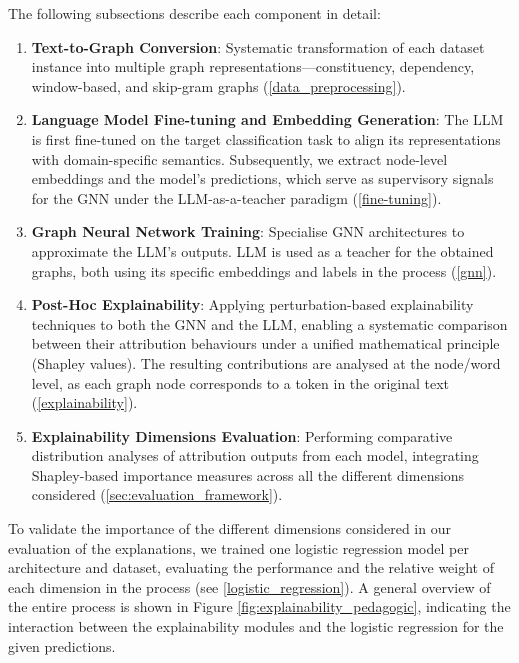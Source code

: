 \documentclass[preprint, times, review, 10pt]{elsarticle}
\begin{document}
The following subsections describe each component in detail:
\begin{enumerate}

\item \textbf{Text-to-Graph Conversion}: Systematic transformation of each dataset instance into multiple graph representations—constituency, dependency, window-based, and skip-gram graphs (\ref{data_preprocessing}).

\item \textbf{Language Model Fine-tuning and Embedding Generation}: The LLM is first fine-tuned on the target classification task to align its representations with domain-specific semantics. Subsequently, we extract node-level embeddings and the model’s predictions, which serve as supervisory signals for the GNN under the LLM-as-a-teacher paradigm (\ref{fine-tuning}).

\item \textbf{Graph Neural Network Training}: Specialise GNN architectures to approximate the LLM’s outputs.  LLM is used as a teacher for the obtained graphs, both using its specific embeddings and labels in the process (\ref{gnn}).

\item \textbf{Post-Hoc Explainability}: Applying perturbation-based explainability techniques to both the GNN and the LLM, enabling a systematic comparison between their attribution behaviours under a unified mathematical principle (Shapley values). The resulting contributions are analysed at the node/word level, as each graph node corresponds to a token in the original text (\ref{explainability}).

\item \textbf{Explainability Dimensions Evaluation}: Performing comparative distribution analyses of attribution outputs from each model, integrating Shapley-based importance measures across all the different dimensions considered (\ref{sec:evaluation_framework}).
\end{enumerate}

To validate the importance of the different dimensions considered in our evaluation of the explanations, we trained one logistic regression model per architecture and dataset, evaluating the performance and the relative weight of each dimension in the process (see \ref{logistic_regression}). A general overview of the entire process is shown in Figure \ref{fig:explainability_pedagogic}, indicating the interaction between the explainability modules and the logistic regression for the given predictions.
\end{document}
